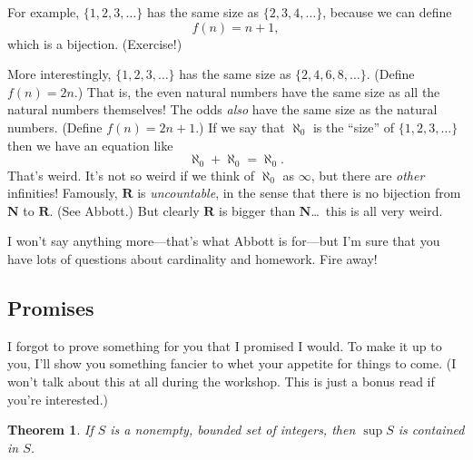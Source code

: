 \documentclass[12pt]{article}
\newtheorem{theorem}{Theorem}
\theoremstyle{definition}
\begin{document}
For example, $\{1, 2, 3, \dots\}$ has the same size as $\{2, 3, 4, \dots\}$,
because we can define
\begin{equation*}
    f(n) = n + 1,
\end{equation*}
which is a bijection. (Exercise!)

More interestingly, $\{1, 2, 3, \dots \}$ has the same size as $\{2, 4, 6, 8,
\dots\}$. (Define $f(n) = 2n$.) That is, the even natural numbers have the same
size as all the natural numbers themselves! The odds \emph{also} have the same
size as the natural numbers. (Define $f(n) = 2n + 1$.) If we say that
$\aleph_0$ is the ``size'' of $\{1, 2, 3, \dots\}$ then we have an equation
like
\begin{equation*}
    \aleph_0 + \aleph_0 = \aleph_0.
\end{equation*}
That's weird. It's not so weird if we think of $\aleph_0$ as $\infty$, but
there are \emph{other} infinities! Famously, $\mathbf{R}$ is
\emph{uncountable}, in the sense that there is no bijection from $\mathbf{N}$
to $\mathbf{R}$. (See Abbott.) But clearly $\mathbf{R}$ is bigger than
$\mathbf{N}$\dots\ this is all very weird.

I won't say anything more---that's what Abbott is for---but I'm sure that you
have lots of questions about cardinality and homework. Fire away!






\subsection*{Promises}%
\label{sub:promises}

I forgot to prove something for you that I promised I would. To make it up to
you, I'll show you something fancier to whet your appetite for things to come.
(I won't talk about this at all during the workshop. This is just a bonus read
if you're interested.)

\begin{theorem}
    If $S$ is a nonempty, bounded set of integers, then $\sup S$ is contained
    in $S$.
\end{theorem}
\end{document}
